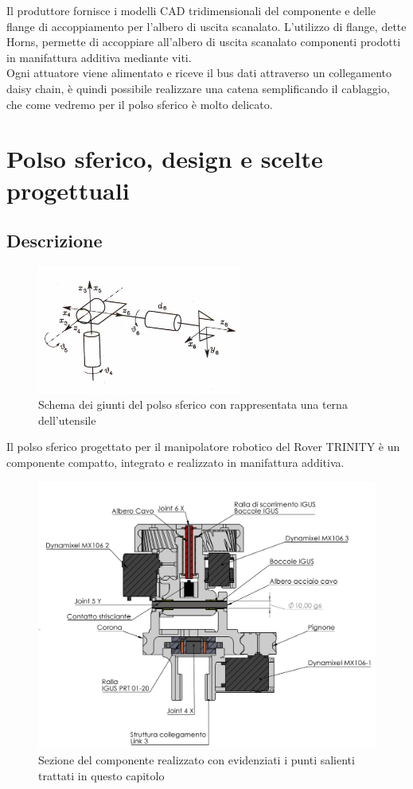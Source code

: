 \documentclass[%
corpo=11pt,
twoside,
 stile=classica,
oldstyle,
greek,%
]{toptesi}
\begin{document}
	Il produttore fornisce i modelli CAD tridimensionali del componente e delle flange di accoppiamento per l'albero di uscita scanalato. L'utilizzo di flange, dette Horns, permette di accoppiare all'albero di uscita scanalato componenti prodotti in manifattura additiva mediante viti. \\
	Ogni attuatore viene alimentato e riceve il bus dati attraverso un collegamento daisy chain, è quindi possibile realizzare una catena semplificando il cablaggio, che come vedremo per il polso sferico è molto delicato. 

		
\chapter{Polso sferico, design e scelte progettuali}
	\section{Descrizione}
	\begin{figure}
		\centering
		\includegraphics[width=0.6\textwidth]{image/sferico.png}
		\caption{Schema dei giunti del polso sferico con rappresentata una terna dell'utensile}
		\label{fig:sferico}
	\end{figure}
	Il polso sferico progettato per il manipolatore robotico del Rover TRINITY è un componente compatto, integrato e realizzato in manifattura additiva. 
	\begin{figure}
		\centering
		\includegraphics[width=1.2\textwidth]{Screen/wristsection.png}
		\caption{Sezione del componente realizzato con evidenziati i punti salienti trattati in questo capitolo}
		\label{fig:disegnosferico}
	\end{figure} 
\end{document}
